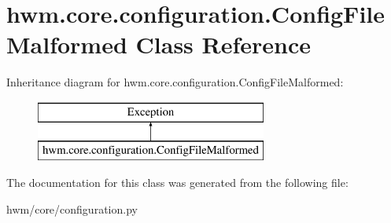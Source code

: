 \hypertarget{classhwm_1_1core_1_1configuration_1_1_config_file_malformed}{\section{hwm.\-core.\-configuration.\-Config\-File\-Malformed Class Reference}
\label{classhwm_1_1core_1_1configuration_1_1_config_file_malformed}
}
Inheritance diagram for hwm.\-core.\-configuration.\-Config\-File\-Malformed\-:\begin{figure}[H]
\begin{center}
\leavevmode
\includegraphics[height=2.000000cm]{classhwm_1_1core_1_1configuration_1_1_config_file_malformed}
\end{center}
\end{figure}


The documentation for this class was generated from the following file\-:\begin{DoxyCompactItemize}
\item 
hwm/core/configuration.\-py\end{DoxyCompactItemize}
